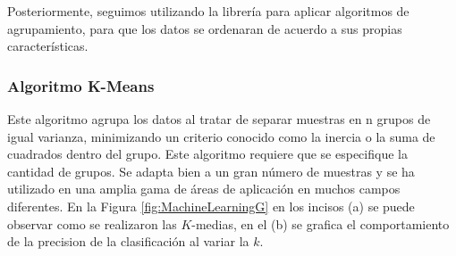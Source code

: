 \documentclass[5p,times]{elsarticle}
\begin{document}
Posteriormente, seguimos utilizando la librería para aplicar algoritmos de agrupamiento, para que los datos se ordenaran de acuerdo a sus propias características.

\subsubsection*{Algoritmo K-Means}

Este algoritmo \cite{hartigan1979algorithm} agrupa los datos al tratar de separar muestras en n grupos de igual varianza, minimizando un criterio conocido como la inercia o la suma de cuadrados dentro del grupo. Este algoritmo requiere que se especifique la cantidad de grupos. Se adapta bien a un gran número de muestras y se ha utilizado en una amplia gama de áreas de aplicación en muchos campos diferentes. En la Figura \ref{fig:MachineLearningG} en los incisos (a) se puede observar como se realizaron las $K$-medias, en el (b) se grafica el comportamiento de la precision de la clasificación al variar la $k$.
\end{document}
